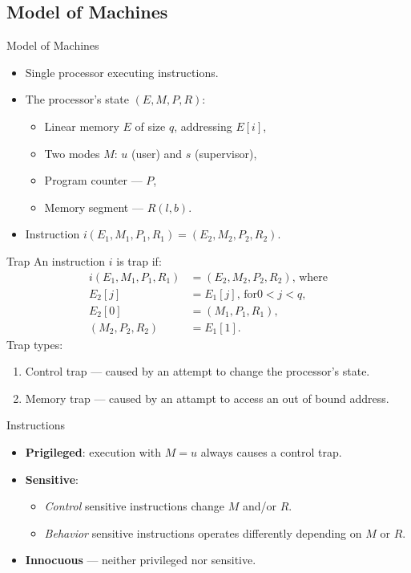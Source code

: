 \subsection{Model of Machines}

\begin{frame}{Model of Machines}
\begin{itemize}
\item Single processor executing instructions.
\item The processor's state $(E, M, P, R)$:
  \begin{itemize}
  \item Linear memory $E$ of size $q$, addressing $E[i]$,
  \item Two modes $M$: $u$ (user) and $s$ (supervisor),
  \item Program counter --- $P$,
  \item Memory segment --- $R (l, b)$.
  \end{itemize}
\item Instruction $i(E_1, M_1, P_1, R_1) = (E_2, M_2, P_2, R_2)$.
\end{itemize}
\end{frame}

\begin{frame}{Trap}
An instruction $i$ is trap if:
\begin{equation*}
  \begin{aligned}
  i(E_1, M_1, P_1, R_1) &= (E_2, M_2, P_2, R_2)\text{, where} \\
  E_2[j] &= E_1[j]\text{, for} 0 < j < q, \\
  E_2[0] &= (M_1, P_1, R_1), \\
  (M_2, P_2, R_2) &= E_1[1].
  \end{aligned}
\end{equation*}
\pause\vfill
Trap types:
\begin{enumerate}
\item Control trap --- caused by an attempt to change the processor's state.
\item Memory trap --- caused by an attampt to access an out of bound address.
\end{enumerate}
\end{frame}

\begin{frame}{Instructions}
\begin{itemize}
\item \textbf{Prigileged}: execution with $M=u$ always causes a
  control trap.\pause
\item \textbf{Sensitive}:
  \begin{itemize}
  \item \textit{Control} sensitive instructions change $M$ and/or $R$.
  \item \textit{Behavior} sensitive instructions operates differently depending
    on $M$ or $R$.\pause
  \end{itemize}
  \item \textbf{Innocuous} --- neither privileged nor sensitive.
\end{itemize}
\end{frame}

